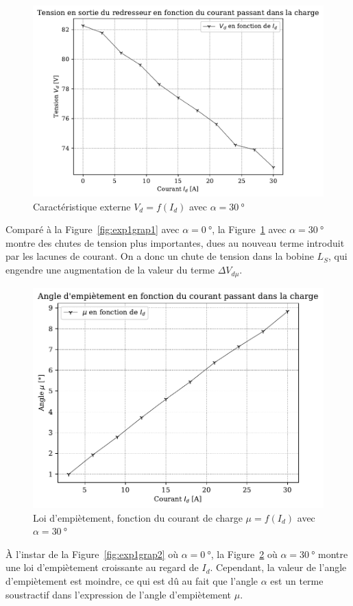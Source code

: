 \documentclass[a4paper, 11pt, openany, oneside, french]{article}
\begin{document}
\begin{figure}[!ht]
    \centering
    \includegraphics[width=0.8\linewidth]{exp1_graph3}
    \caption{Caractéristique externe $V_d=f\left(I_d\right)$ avec $\alpha = \SI{30}{\degree}$}
    \label{fig:exp1grap3}
\end{figure}

Comparé à la Figure~\ref{fig:exp1grap1} avec $\alpha = \SI{0}{\degree}$, la Figure~\ref{fig:exp1grap3} avec $\alpha = \SI{30}{\degree}$ montre des chutes de tension plus importantes, dues au nouveau terme introduit par les lacunes de courant. On a donc un chute de tension dans la bobine $L_S$, qui engendre une augmentation de la valeur du terme $\Delta V_{d\mu}$.

\begin{figure}[!ht]
    \centering
    \includegraphics[width=0.8\linewidth]{exp1_graph4}
    \caption{Loi d'empiètement, fonction du courant de charge $\mu=f\left(I_d\right)$ avec $\alpha = \SI{30}{\degree}$}
    \label{fig:exp1grap4}
\end{figure}

À l'instar de la Figure~\ref{fig:exp1grap2} où $\alpha = \SI{0}{\degree}$, la Figure~\ref{fig:exp1grap4} où $\alpha = \SI{30}{\degree}$ montre une loi d'empiètement croissante au regard de $I_d$. Cependant, la valeur de l'angle d'empiètement est moindre, ce qui est dû au fait que l'angle $\alpha$ est un terme soustractif dans l'expression de l'angle d'empiètement $\mu$.
\end{document}
